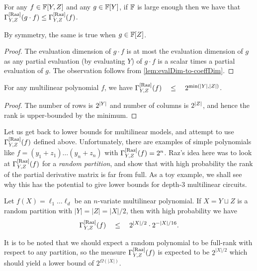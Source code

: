 \begin{observation}\label{obs:pdm-mult-by-univariate}
For any $f \in \mathbb{F}[Y,Z]$ and any $g \in \mathbb{F}[Y]$, if $\mathbb{F}$ is large enough then we have that $\Gamma^{\mathrm{[Raz]}}_{Y,Z}(g \cdot f) \leq \Gamma^{\mathrm{[Raz]}}_{Y,Z}(f)$. 

By symmetry, the same is true when $g \in \mathbb{F}[Z]$. 
\end{observation}
\begin{proof}
  The evaluation dimension of $g \cdot f$ is at most the evaluation dimension of $g$ as any partial evaluation (by evaluating $Y$) of $g \cdot f$ is a scalar times a partial evaluation of $g$.
The observation follows from \autoref{lem:evalDim-to-coeffDim}.
\end{proof}


\begin{observation}\label{obs:pdm-upperbound}
For any multilinear polynomial $f$, we have  $\Gamma^{\mathrm{[Raz]}}_{Y,Z}(f) \quad \leq \quad 2^{\min(\left|Y\right|, \left|Z\right|)}$.
\end{observation}
\begin{proof}
  The number of rows is $2^{\left|Y\right|}$ and number of columns is $2^{\left|Z\right|}$, and hence the rank is upper-bounded by the minimum.
\end{proof}

Let us get back to lower bounds for multilinear models, and attempt to use $\Gamma^{\mathrm{[Raz]}}_{Y,Z}(f)$ defined above. 
Unfortunately, there are examples of simple polynomials like $f = (y_1 + z_1)\dots (y_n + z_n)$ with $\Gamma^{\mathrm{[Raz]}}_{Y,Z}(f) = 2^n$. 
Raz's idea here was to look at $\Gamma^{\mathrm{[Raz]}}_{Y,Z}(f)$ for a \emph{random partition}, and show that with high probability the rank of the partial derivative matrix is far from full. 
As a toy example, we shall see why this has the potential to give lower bounds for depth-$3$ multilinear circuits. 

\begin{lemma}\label{lem:raz-depth-three}
Let $f(X) = \ell_1 \dots \ell_d$ be an $n$-variate multilinear polynomial. 
If $X = Y\sqcup Z$ is a random partition with $|Y| = |Z| = |X|/2$, then with high probability we have
$$
\Gamma^{\mathrm{[Raz]}}_{Y,Z}(f) \quad \leq \quad 2^{|X|/2} \cdot 2^{-|X|/16}.
$$
\end{lemma}

It is to be noted that we should expect a random polynomial to be full-rank with respect to any partition, so the measure $\Gamma^{\mathrm{[Raz]}}_{Y,Z}(f)$ is expected to be $2^{|X|/2}$ which should yield a lower bound of $2^{\Omega(|X|)}$. 

